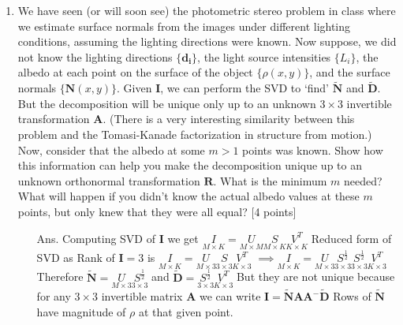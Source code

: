 \documentclass[11pt]{article}
\begin{document}
\begin{enumerate}
\begin{enumerate}
\item We have seen (or will soon see) the photometric stereo problem in class where we estimate surface normals from the images under different lighting conditions, assuming the lighting directions were known. Now suppose, we did not know the lighting directions $\{\mathbf{d_i}\}$, the light source intensities $\{L_i\}$, the albedo at each point on the surface of the object $\{\rho(x,y)\}$, and the surface normals $\{\mathbf{N}(x,y)\}$. Given $\mathbf{I}$, we can perform the SVD to `find' $\mathbf{\tilde{N}}$ and $\mathbf{\tilde{D}}$. But the decomposition will be unique only up to an unknown $3 \times 3$ invertible transformation $\mathbf{A}$. (There is a very interesting similarity between this problem and the Tomasi-Kanade factorization in structure from motion.) Now, consider that the albedo at some $m > 1$ points was known. Show how this information can help you make the decomposition unique up to an unknown orthonormal transformation $\mathbf{R}$. What is the minimum $m$ needed? What will happen if you didn't know the actual albedo values at these $m$ points, but only knew that they were all equal? \textsf{[4 points]}
\begin{itemize}
\item[Ans.] 
 Computing SVD of  $\mathbf{I}$ we get\newline
 $\underset{M\times K}{I} = \underset{M\times M}{U}\underset{M\times K}{S}\underset{K\times K}{V^T}$ \newline
 Reduced form of SVD as Rank of $\mathbf{I} = 3$ is \newline
 $\underset{M\times K}{I} = \underset{M\times 3}{U}\underset{3\times 3}{S}\underset{K\times 3}{V^T}$ \newline
 $\implies \underset{M\times K}{I} = \underset{M\times 3}{U}\underset{3\times 3}{S^\frac{1}{2}}\underset{3\times 3}{S^\frac{1}{2}}\underset{K\times 3}{V^T}$\newline
 Therefore $\mathbf{\tilde{N}} = \underset{M\times 3}{U}\underset{3\times 3}{S^\frac{1}{2}}$ and $\mathbf{\tilde{D}} = \underset{3\times 3}{S^\frac{1}{2}}\underset{K\times 3}{V^T}$\newline
 But they are not unique because for any  $3\times 3$ invertible matrix $\mathbf{A}$ we can write \newline
 $\mathbf{I} = \mathbf{\tilde{N}}\mathbf{A}\mathbf{A^-}\mathbf{\tilde{D}}$ \newline
 Rows of $\mathbf{\tilde{N}}$ have magnitude of $\rho$ at that given point.\newline

\end{itemize}
\end{enumerate}
\end{enumerate}
\end{document}

